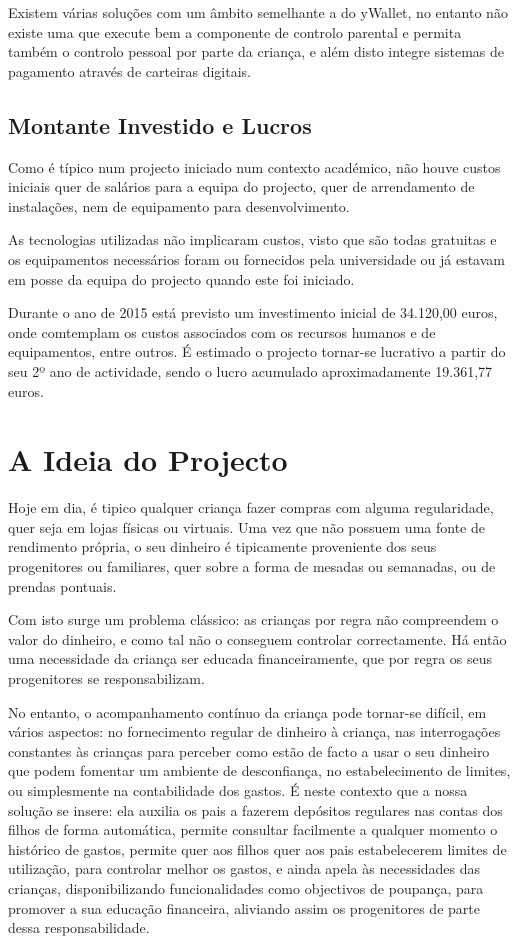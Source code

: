 \documentclass[12pt,a4paper]{article}
\begin{document}
Existem várias soluções com um âmbito semelhante a do yWallet, no entanto não existe uma que execute bem a componente de controlo parental e permita também o controlo pessoal por parte da criança, e além disto integre sistemas de pagamento através de carteiras digitais.

\subsection{Montante Investido e Lucros}
\label{subsec:montante_investido_e_lucros}

Como é típico num projecto iniciado num contexto académico, não houve custos iniciais quer de salários para a equipa do projecto, quer de arrendamento de instalações, nem de equipamento para desenvolvimento.

As tecnologias utilizadas não implicaram custos, visto que são todas gratuitas e os equipamentos necessários foram ou fornecidos pela universidade ou já estavam em posse da equipa do projecto quando este foi iniciado.

Durante o ano de 2015 está previsto um investimento inicial de 34.120,00 euros, onde comtemplam os custos associados com os recursos humanos e de equipamentos, entre outros.
É estimado o projecto tornar-se lucrativo a partir do seu 2º ano de actividade, sendo o lucro acumulado aproximadamente 19.361,77 euros.

\newpage
\section{A Ideia do Projecto}
\label{sec:a_ideia_do_projecto}

Hoje em dia, é tipico qualquer criança fazer compras com alguma regularidade, quer seja em lojas físicas ou virtuais. Uma vez que não possuem uma fonte de rendimento própria, o seu dinheiro é tipicamente proveniente dos seus progenitores ou familiares, quer sobre a forma de mesadas ou semanadas, ou de prendas pontuais.

Com isto surge um problema clássico: as crianças por regra não compreendem o valor do dinheiro, e como tal não o conseguem controlar correctamente. Há então uma necessidade da criança ser educada financeiramente, que por regra os seus progenitores se responsabilizam.

No entanto, o acompanhamento contínuo da criança pode tornar-se difícil, em vários aspectos: no fornecimento regular de dinheiro à criança, nas interrogações constantes às crianças para perceber como estão de facto a usar o seu dinheiro que podem fomentar um ambiente de desconfiança, no estabelecimento de limites, ou simplesmente na contabilidade dos gastos.
É neste contexto que a nossa solução se insere: ela auxilia os pais a fazerem depósitos regulares nas contas dos filhos de forma automática, permite consultar facilmente a qualquer momento o histórico de gastos, permite quer aos filhos quer aos pais estabelecerem limites de utilização, para controlar melhor os gastos, e ainda apela às necessidades das crianças, disponibilizando funcionalidades como objectivos de poupança, para promover a sua educação financeira, aliviando assim os progenitores de parte dessa responsabilidade.
\end{document}
